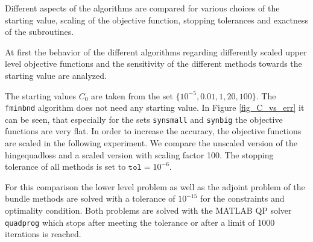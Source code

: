 Different aspects of the algorithms are compared for various choices  of the starting value, scaling of the objective function, stopping tolerances and exactness of the subroutines.


At first the behavior of the different algorithms regarding differently scaled upper level objective functions and the sensitivity of the different methods towards the starting value are analyzed.

The starting values \(C_0 \) are taken from the set \(\{10^{-5},0.01,1,20,100\}\). The \texttt{fminbnd} algorithm does not need any starting value.
In Figure \ref{fig_C_vs_err} it can be seen, that especially for the sets \texttt{synsmall} and \texttt{synbig} the objective functions are very flat. In order to increase the accuracy, the objective functions are scaled in the following experiment.
We compare the unscaled version of the hingequadloss and a scaled version with scaling factor 100.
The stopping tolerance of all methods is set to \(\texttt{tol} = 10^{-6}\).

For this comparison the lower level problem as well as the adjoint problem of the bundle methods are solved with a tolerance of \(10^{-15}\) for the constraints and optimality condition.
Both problems are solved with the MATLAB QP solver \texttt{quadprog} which stops after meeting the tolerance or after a limit of 1000 iterations is reached.


